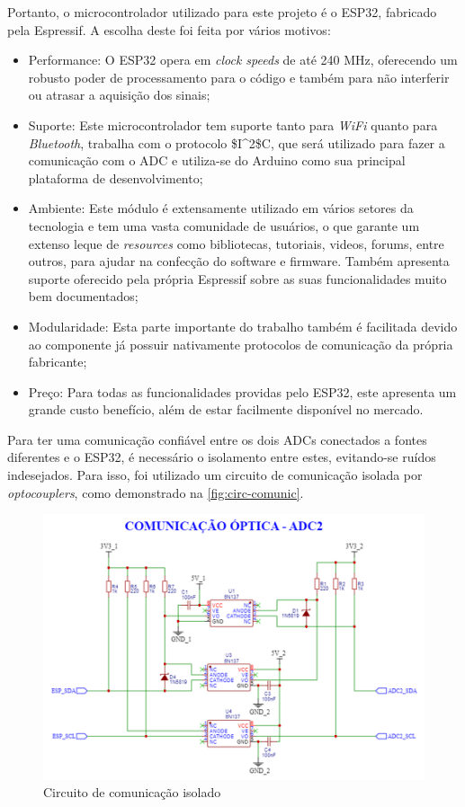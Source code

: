 Portanto, o microcontrolador utilizado para este projeto é o ESP32, fabricado pela Espressif. A escolha deste foi feita por vários motivos:

\begin{itemize}
    \item Performance: O ESP32 opera em \textit{clock speeds} de até 240 MHz, oferecendo um robusto poder de processamento para o código e também para não interferir ou atrasar a aquisição dos sinais;
    \item Suporte: Este microcontrolador tem suporte tanto para \textit{WiFi} quanto para \textit{Bluetooth}, trabalha com o protocolo \gls{$I^2$C}, que será utilizado para fazer a comunicação com o \gls{ADC} e utiliza-se do Arduino como sua principal plataforma de desenvolvimento;
    \item Ambiente: Este módulo é extensamente utilizado em vários setores da tecnologia e tem uma vasta comunidade de usuários, o que garante um extenso leque de \textit{resources} como bibliotecas, tutoriais, videos, forums, entre outros, para ajudar na confecção do software e firmware. Também apresenta suporte oferecido pela própria Espressif sobre as suas funcionalidades muito bem documentados;
    \item Modularidade: Esta parte importante do trabalho também é facilitada devido ao componente já possuir nativamente protocolos de comunicação da própria fabricante;
    \item Preço: Para todas as funcionalidades providas pelo ESP32, este apresenta um grande custo benefício, além de estar facilmente disponível no mercado.
\end{itemize}

Para ter uma comunicação confiável entre os dois \gls{ADC}s conectados a fontes diferentes e o ESP32, é necessário o isolamento entre estes, evitando-se ruídos indesejados. Para isso, foi utilizado um circuito de comunicação isolada por \textit{optocouplers}, como demonstrado na \autoref{fig:circ-comunic}.

\begin{figure}[htb!]
    \caption{Circuito de comunicação isolado}
    \label{fig:circ-comunic}
    \includegraphics[width=1.0\textwidth]{figuras/circ-comunic.png}
    \fonte{}
\end{figure}

